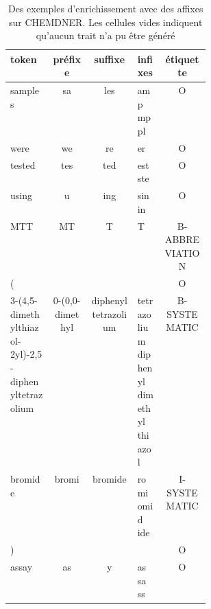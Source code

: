 \documentclass[12pt,a4paper,times,twoside,openright]{report}
\begin{document}
\begin{table}[ht!]
\centering
\footnotesize
\begin{tabular}{|p{0.21\linewidth}|c|c|p{0.13\linewidth}|c|}
\hline
token & préfixe & suffixe & infixes & étiquette\\
\hline
samples & sa & les & amp mp pl & O\\
\hline
were & we & re & er & O\\
\hline
tested & tes & ted & est ste & O\\
\hline
using & u & ing & sin in & O\\
\hline
MTT & MT & T & T & B-ABBREVIATION\\
\hline
( & & & & O\\
\hline
3-(4,5-dimethylthiazol-2yl)-2,5-diphenyltetrazolium & 0-(0,0-dimethyl & diphenyltetrazolium & tetrazolium diphenyl dimethyl thiazol & B-SYSTEMATIC\\
\hline
bromide & bromi & bromide & romi omid ide & I-SYSTEMATIC\\
\hline
) &  &  &  & O\\
\hline
assay & as & y & as sa ss & O\\
\hline
\end{tabular}
\caption{Des exemples d'enrichissement avec des affixes sur CHEMDNER. Les cellules vides indiquent qu'aucun trait n'a pu être généré}
\label{tab:affixes-example}
\end{table}


        
\end{document}
